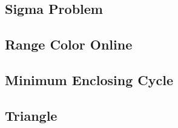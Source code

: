 \documentclass[a4paper,10pt,twocolumn,oneside]{article}
\begin{document}
\subsection{Sigma Problem}


\subsection{Range Color Online}


\subsection{Minimum Enclosing Cycle}


\subsection{Triangle}

\end{document}
